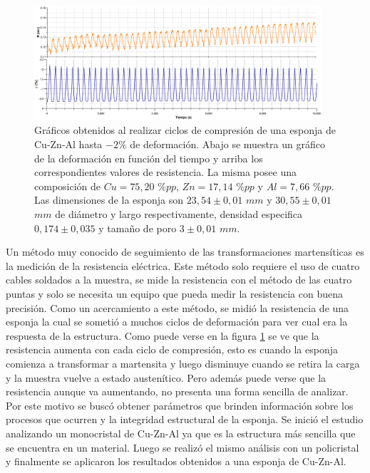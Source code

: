 \documentclass[a4paper,12pt,fleqn,twoside,openany]{book}
\begin{document}
 \begin{figure}
 \centering
 \includegraphics[width=0.95\textwidth]{Img/Resultados/Resistencia/Ciclos.eps}
 \caption{Gráficos obtenidos al realizar ciclos de compresión de una esponja de Cu-Zn-Al hasta $-2\%$ de deformación. Abajo se muestra un gráfico de la deformación en función del tiempo y arriba los correspondientes valores de resistencia. La misma posee una composición de $Cu=75,20$ $\%pp$, $Zn=17,14$ $\%pp$ y $Al=7,66$ $\%pp$. Las dimensiones de la esponja son $23,54 \pm0,01$ $mm$ y $30,55 \pm0,01$ $mm$ de diámetro y largo respectivamente, densidad especifica $0,174 \pm 0,035$ y tamaño de poro $3 \pm 0,01$ $mm$.} 
 \label{fig:CiclosResistencia}
 \end{figure}

 Un método muy conocido de seguimiento de las transformaciones martensíticas es la medición de la resistencia eléctrica. Este método solo requiere el uso de cuatro cables soldados a la muestra, se mide la resistencia con el método de las cuatro puntas y solo se necesita un equipo que pueda medir la resistencia con buena precisión. Como un acercamiento a este método, se midió la resistencia de una esponja la cual se sometió a muchos ciclos de deformación para ver cual era la respuesta de la estructura. Como puede verse en la figura \ref{fig:CiclosResistencia} se ve que la resistencia aumenta con cada ciclo de compresión, esto es cuando la esponja comienza a transformar a martensita y luego disminuye cuando se retira la carga y la muestra vuelve a estado austenítico. Pero además puede verse que la resistencia aunque va aumentando, no presenta una forma sencilla de analizar. Por este motivo se buscó obtener parámetros que brinden información sobre los procesos que ocurren y la integridad estructural de la esponja. Se inició el estudio analizando un monocristal de Cu-Zn-Al ya que es la estructura más sencilla que se encuentra en un material. Luego se realizó el mismo análisis con un policristal y finalmente se aplicaron los resultados obtenidos a una esponja de Cu-Zn-Al.
\end{document}
